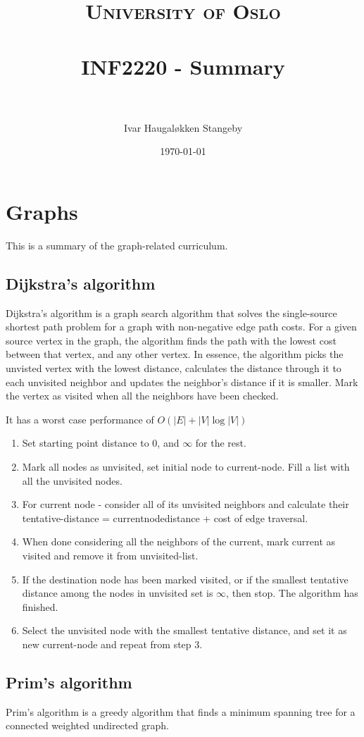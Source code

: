 \documentclass[paper=a4, fontsize=11pt]{scrartcl}
\title{ 
  \normalfont \normalsize
  \textsc{University of Oslo} \\ [25pt] %
  \horrule{0.5pt} \\[0.4cm] %
  \huge INF2220 - Summary \\ %
  \horrule{2pt} \\[0.5cm] %
}
\author{Ivar Haugaløkken Stangeby} %
\date{\normalsize\today} %
\numberwithin{equation}{section} %
\numberwithin{figure}{section} %
\numberwithin{table}{section} %
\theoremstyle{definition}
\begin{document}
\maketitle %

\section{Graphs}

This is a summary of the graph-related curriculum.
\subsection{Dijkstra's algorithm}
Dijkstra's algorithm is a graph search algorithm that solves the single-source
shortest path problem for a graph with non-negative edge path costs.  For a
given source vertex in the graph, the algorithm finds the path with the lowest
cost between that vertex, and any other vertex.  In essence, the algorithm
picks the unvisted vertex with the lowest distance, calculates the distance
through it to each unvisited neighbor and updates the neighbor's distance if it
is smaller. Mark the vertex as visited when all the neighbors have been
checked.

It has a worst case performance of \(O\left(|E| + |V|\log|V|\right)\)

\begin{enumerate}
  \item Set starting point distance to 0, and \(\infty\) for the rest.
  \item Mark all nodes as unvisited, set initial node to current-node. Fill a list with all the unvisited nodes.
  \item For current node - consider all of its unvisited neighbors and calculate their tentative-distance = currentnodedistance + cost of edge traversal.
  \item When done considering all the neighbors of the current, mark current as visited and remove it from unvisited-list.
  \item If the destination node has been marked visited, or if the smallest tentative distance among the nodes in unvisited set is \(\infty\), then stop. The algorithm has finished.
  \item Select the unvisited node with the smallest tentative distance, and set it as new current-node and repeat from step 3.
\end{enumerate}

\subsection{Prim's algorithm}
Prim's algorithm is a greedy algorithm that finds a minimum spanning tree for a
connected weighted undirected graph.
\end{document}
